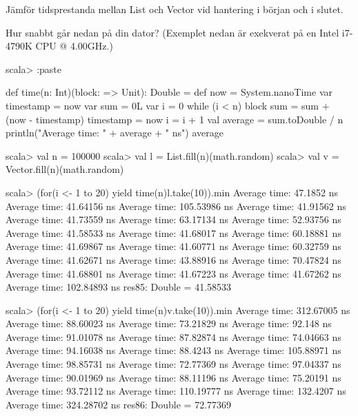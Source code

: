 {{\Subtask {} %

\Subtask {}  %

\Subtask {} %

\Subtask {}	%

\Subtask {} %

\Subtask {} %

\Subtask {} %



\Task Jämför tidsprestanda mellan List och Vector vid hantering i början och i slutet. 

\Subtask Hur snabbt går nedan på din dator? (Exemplet nedan är exekverat på en Intel i7-4790K CPU @ 4.00GHz.) %

\begin{REPLnonum}
scala> :paste

def time(n: Int)(block: => Unit): Double =  {
  def now = System.nanoTime
  var timestamp = now
  var sum = 0L
  var i = 0
  while (i < n) {
    block
    sum = sum + (now - timestamp)
    timestamp = now
    i = i + 1
  }
  val average = sum.toDouble / n
  println("Average time: " + average + " ns")
  average
}

scala> val n = 100000
scala> val l = List.fill(n)(math.random)
scala> val v = Vector.fill(n)(math.random)

scala> (for(i <- 1 to 20) yield time(n){l.take(10)}).min
Average time: 47.1852 ns
Average time: 41.64156 ns
Average time: 105.53986 ns
Average time: 41.91562 ns
Average time: 41.73559 ns
Average time: 63.17134 ns
Average time: 52.93756 ns
Average time: 41.58533 ns
Average time: 41.68017 ns
Average time: 60.18881 ns
Average time: 41.69867 ns
Average time: 41.60771 ns
Average time: 60.32759 ns
Average time: 41.62671 ns
Average time: 43.88916 ns
Average time: 70.47824 ns
Average time: 41.68801 ns
Average time: 41.67223 ns
Average time: 41.67262 ns
Average time: 102.84893 ns
res85: Double = 41.58533

scala> (for(i <- 1 to 20) yield time(n){v.take(10)}).min
Average time: 312.67005 ns
Average time: 88.60023 ns
Average time: 73.21829 ns
Average time: 92.148 ns
Average time: 91.01078 ns
Average time: 87.82874 ns
Average time: 74.04663 ns
Average time: 94.16038 ns
Average time: 88.4243 ns
Average time: 105.88971 ns
Average time: 98.85731 ns
Average time: 72.77369 ns
Average time: 97.04337 ns
Average time: 90.01969 ns
Average time: 88.11196 ns
Average time: 75.20191 ns
Average time: 93.72112 ns
Average time: 110.19777 ns
Average time: 132.4207 ns
Average time: 324.28702 ns
res86: Double = 72.77369


\end{REPLnonum}}}
